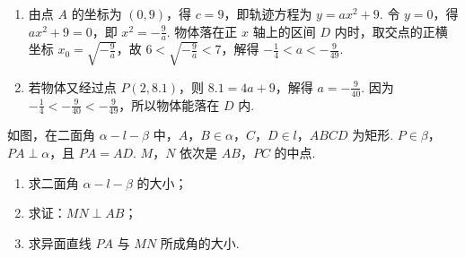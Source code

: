 \documentclass[UTF8,a4paper,oneside,11pt]{ctexbook}
\begin{document}
\begin{solution}
\begin{enumerate}
\item 由点 \(A\) 的坐标为 \((0,9)\)，得 \(c=9\)，即轨迹方程为 \(y=ax^{2}+9\). 令 \(y=0\)，得 \(ax^{2}+9=0\)，即 \(x^{2}=-\frac{9}{a}\). 物体落在正 \(x\) 轴上的区间 \(D\) 内时，取交点的正横坐标 \(x_{0}=\sqrt{-\frac{9}{a}}\)，故 \(6<\sqrt{-\frac{9}{a}}<7\)，解得 \(-\frac{1}{4}<a<-\frac{9}{49}\).
\item 若物体又经过点 \(P(2,8.1)\)，则 \(8.1=4a+9\)，解得 \(a=-\frac{9}{40}\). 因为 \(-\frac{1}{4}<-\frac{9}{40}<-\frac{9}{49}\)，所以物体能落在 \(D\) 内.
\end{enumerate}
\end{solution}

\begin{problem}
如图，在二面角 \(\alpha-l-\beta\) 中，\(A\)，\(B\in\alpha\)，\(C\)，\(D\in l\)，\(ABCD\) 为矩形. \(P\in\beta\)，\(PA\perp\alpha\)，且 \(PA=AD\). \(M\)，\(N\) 依次是 \(AB\)，\(PC\) 的中点.

\begin{enumerate}
\item 求二面角 \(\alpha-l-\beta\) 的大小；
\item 求证：\(MN\perp AB\)；
\item 求异面直线 \(PA\) 与 \(MN\) 所成角的大小.
\end{enumerate}

\FloatBarrier
\end{problem}
\end{document}
